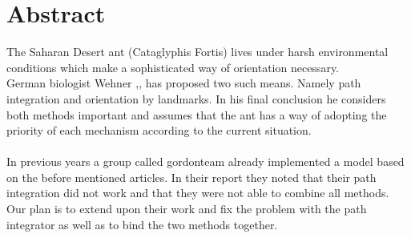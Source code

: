 \documentclass[11pt]{article}
\begin{document}






\tableofcontents

\newpage


\section{Abstract}
The Saharan Desert ant (Cataglyphis Fortis) lives under harsh environmental conditions which make a sophisticated way of orientation necessary.\\
German biologist Wehner \cite{Wehner2003},\cite{Wehner1988}, \cite{Wehner1998} has proposed two such means. Namely path integration and orientation by landmarks.
In his final conclusion he considers both methods important and assumes that the ant has a way of adopting the priority of each mechanism according to the current situation.\\
\ \\
 In previous years a group called gordonteam\cite{GordonTeam2008} already implemented a model based on the before mentioned articles. In their report they noted that their path integration did not work and that they were not able to combine all methods. Our plan is to extend upon their work and fix the problem with the path integrator as well as to bind the two methods together. 

\newpage
\end{document}
